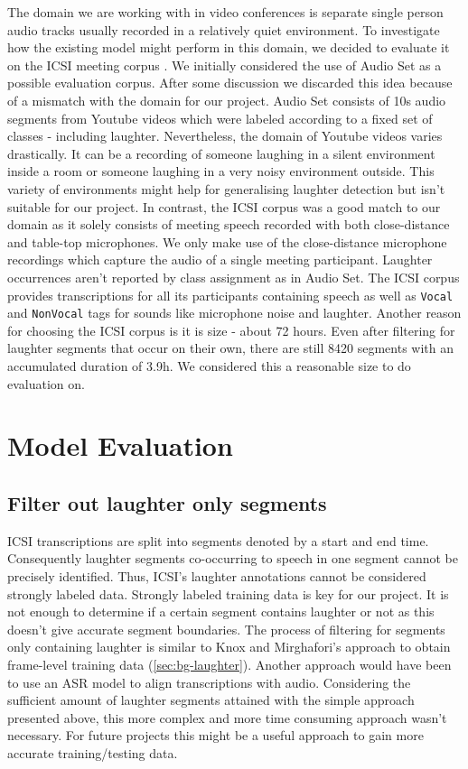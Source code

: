 \documentclass[bsc,frontabs,parskip,deptreport]{infthesis}
\begin{document}
The domain we are working with in video conferences is separate single person audio tracks usually recorded in a relatively quiet environment.
To investigate how the existing model might perform in this domain, we decided to evaluate it on the ICSI meeting corpus \cite{morgan2001meeting}. 
We initially considered the use of Audio Set \cite{googleaudioset} as a possible evaluation corpus. After some discussion we discarded this idea because of a mismatch with the domain for our project. Audio Set  consists of 10s audio segments from Youtube videos which were labeled according to a fixed set of classes - including laughter. Nevertheless, the domain of Youtube videos varies drastically. It can be a recording of someone laughing in a silent environment inside a room or someone laughing in a very noisy environment outside. This variety of environments might help for generalising laughter detection but isn't suitable for our project.
In contrast, the ICSI corpus was a good match to our domain as it solely consists of meeting speech recorded with both close-distance and table-top microphones. 
We only make use of the close-distance microphone recordings which capture the audio of a single meeting participant.
Laughter occurrences aren't reported by class assignment as in Audio Set. The ICSI corpus provides transcriptions for all its participants containing speech as well as \texttt{Vocal} and \texttt{NonVocal} tags for sounds like microphone noise and laughter. 
Another reason for choosing the ICSI corpus is it is size - about 72 hours.
Even after filtering for laughter segments that occur on their own, there are still 8420 segments with an accumulated duration of 3.9h. 
We considered this a reasonable size to do evaluation on. 




\section{Model Evaluation} \label{sec:model-eval}

\subsection{Filter out laughter only segments} \label{subsec:filter-laughter}
ICSI transcriptions are split into segments denoted by a start and end time.
Consequently laughter segments co-occurring to speech in one segment cannot be precisely identified.
Thus, ICSI's laughter annotations cannot be considered strongly labeled data.
Strongly labeled training data is key for our project.
It is not enough to determine if a certain segment contains laughter or not as this doesn't give accurate segment boundaries. 
The process of filtering for segments only containing laughter is similar to Knox and Mirghafori's approach to obtain frame-level training data \cite{knox2006automatic} (\ref{sec:bg-laughter}). 
Another approach would have been to use an ASR model to align transcriptions with audio. Considering the sufficient amount of laughter segments attained with the simple approach presented above, this more complex and more time consuming approach wasn't necessary. For future projects this might be a useful approach to gain more accurate training/testing data. 
\end{document}
